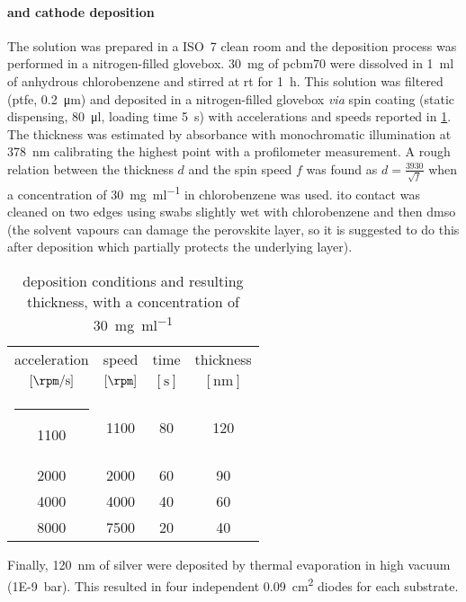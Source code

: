 		\paragraph{ and cathode deposition}
		The solution was prepared in a ISO~7 clean room and the deposition process was performed in a nitrogen-filled glovebox.
		\SI{30}{\mg} of \gls{pcbm70} were dissolved in \SI{1}{\ml} of anhydrous chlorobenzene and stirred at \gls{rt} for \SI{1}{\hour}.
		This solution was filtered (\gls{ptfe}, \SI{0.2}{\um}) and deposited in a nitrogen-filled glovebox \textsl{via} spin coating (static dispensing, \SI{80}{\ul}, loading time \SI{5}{\s}) with accelerations and speeds reported in \cref{table:pcbm_thickness}.
		The thickness was estimated by absorbance with monochromatic illumination at \SI{378}{\nm} calibrating the highest point with a profilometer measurement.
		A rough relation between the thickness $d$ and the spin speed $f$ was found as $d = \frac{3930}{\sqrt{f}}$ when a concentration of \SI{30}{\mg\per\ml} in chlorobenzene was used.
		\Gls{ito} contact was cleaned on two edges using swabs slightly wet with chlorobenzene and then \gls{dmso} (the solvent vapours can damage the perovskite layer, so it is suggested to do this after  deposition which partially protects the underlying layer).
		\begin{table}%
			\caption{ deposition conditions and resulting thickness, with a concentration of \SI{30}{\mg\per\ml}}\label{table:pcbm_thickness}
			\begin{center}
				\begin{tabular}{c c c | c}
					acceleration        & speed         & time        & thickness    \\
					$[\si{\rpm\per\s}]$ & $[\si{\rpm}]$ & $[\si{\s}]$ & $[\si{\nm}]$ \\[1mm]
					\hline
					\rule[0ex]{-4pt}{3ex}
					1100                & 1100          & 80          & 120          \\
					2000                & 2000          & 60          & 90           \\
					4000                & 4000          & 40          & 60           \\
					8000                & 7500          & 20          & 40           \\
				\end{tabular}
			\end{center}
		\end{table}
		Finally, \SI{120}{\nm} of silver were deposited by thermal evaporation in high vacuum (\SI{1E-9}{\bar}).
		This resulted in four independent \SI{0.09}{\cm\squared} diodes for each substrate.
		\label{methods_top_end}

